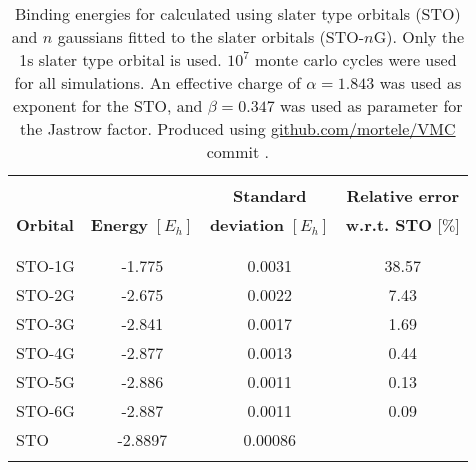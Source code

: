 \documentclass[../../master.tex]{subfiles}
\begin{document}
\begin{table}[p]
\centering{}
\setlength\extrarowheight{2pt}
\begin{tabularx}{\textwidth}{X *{3}{S[table-format=-1.3,table-space-text-post=***]}}
\hline
\hline
\\[-0.9em]
                 &                          & \phantom{-}\textbf{Standard}          & \textbf{Relative error}    \\
\textbf{Orbital} & \textbf{Energy} $[E_h]$  & \textbf{deviation} $[E_h]$ & \textbf{w.r.t. STO} [$\%$]  \\
\\[-0.9em]
\hline
\\[-0.9em]
STO-1G & -1.775  & 0.0031  &  38.57 \\
STO-2G & -2.675  & 0.0022  &   7.43 \\
STO-3G & -2.841  & 0.0017  &   1.69 \\
STO-4G & -2.877  & 0.0013  &   0.44 \\
STO-5G & -2.886  & 0.0011  &   0.13 \\
STO-6G & -2.887  & 0.0011  &   0.09 \\
STO    & -2.8897 & 0.00086 & \\
\\[-0.9em]
\hline
\end{tabularx}
\caption{Binding energies for  calculated using slater type orbitals (STO) and $n$ gaussians fitted to the slater orbitals (STO-$n$G). Only the 1s slater type orbital is used. $10^7$ monte carlo cycles were used for all simulations. An effective charge of $\alpha=1.843$ was used as exponent for the STO, and $\beta=0.347$ was used as parameter for the Jastrow factor. Produced using \url{github.com/mortele/VMC} commit . \label{tab:vmcv1}}
\end{table}
\end{document}
